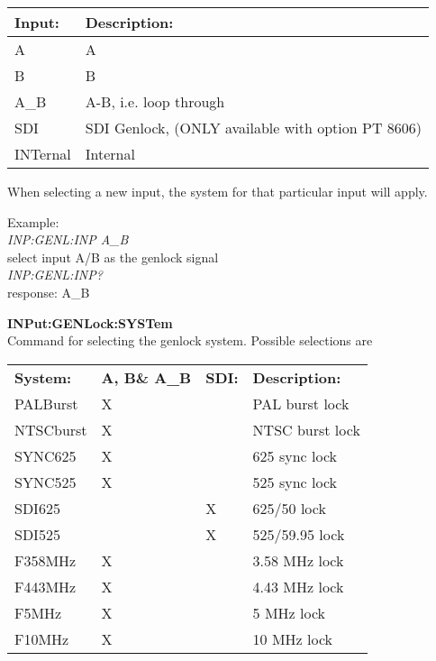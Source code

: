 \begin{tabular}{|l|l|}
\hline
\textbf{Input:} & \textbf{Description:} \\ \hline
A & A \\ \hline
B & B \\ \hline
A\_B & A-B, i.e. loop through \\ \hline
SDI & SDI Genlock, (ONLY available with option PT 8606)\\ \hline
INTernal & Internal\\ 
\hline
\end{tabular}

When selecting a new input, the system for that particular input will apply.

Example:\\
\textit{INP:GENL:INP A\_B}\\
select input A/B as the genlock signal\\
\textit{INP:GENL:INP?}\\
response: A\_B

\textbf{INPut:GENLock:SYSTem}\\
Command for selecting the genlock system. Possible selections are 

\begin{center}
\begin{tabular}{|l|l|l|l|}
\hline
\textbf{System:} 	& \textbf{A, B\& A\_B} & \textbf{SDI:} & \textbf{Description:} \\
PALBurst					& X 									&								&	PAL burst lock 		\\ \hline
NTSCburst					& X 									&								& NTSC burst lock		\\ \hline
SYNC625						& X										& 							& 625 sync lock			\\ \hline
SYNC525						& X										&								& 525 sync lock			\\ \hline
SDI625						&											& X							& 625/50 lock				\\ \hline
SDI525						&											& X							& 525/59.95 lock		\\ \hline
F358MHz						& X										&								& 3.58 MHz lock			\\ \hline
F443MHz						& X										& 							& 4.43 MHz lock			\\ \hline
F5MHz							& X										&								& 5 MHz lock				\\ \hline
F10MHz						& X										&								& 10 MHz lock				\\ \hline
\end{tabular}
\end{center}

